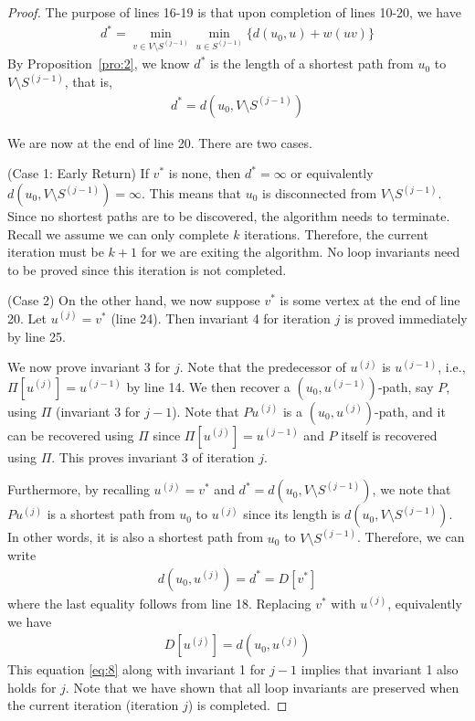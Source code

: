 \documentclass[thmcnt=section, 12pt, color=cyan]{my-elegantbook}
\begin{document}
\begin{proof}
    The purpose of lines 16-19 is that upon completion of lines 10-20, we have 
    \begin{align*}
        d^\ast = \min_{v \in V \setminus S^{(j-1)}}
            \min_{u \in S^{(j-1)}} \{ d(u_0, u) + w(u v) \}
    \end{align*}
    By Proposition~\ref{pro:2}, we know $d^\ast$ is the length of a shortest path from $u_0$ to $V \setminus S^{(j-1)}$, that is, 
    \begin{align*}
        d^\ast = d(u_0, V \setminus S^{(j-1)})
    \end{align*}

    We are now at the end of line 20. There are two cases. 
    
    (Case 1: Early Return) If $v^\ast$ is none, then $d^\ast = \infty$ or equivalently $d(u_0, V \setminus S^{(j-1)}) = \infty$. This means that $u_0$ is disconnected from $V \setminus S^{(j-1)}$. Since no shortest paths are to be discovered, the algorithm needs to terminate. Recall we assume we can only complete $k$ iterations. Therefore, the current iteration must be $k+1$ for we are exiting the algorithm. No loop invariants need to be proved since this iteration is not completed.

    (Case 2) On the other hand, we now suppose $v^\ast$ is some vertex at the end of line 20. Let $u^{(j)} = v^\ast$ (line 24). Then invariant 4 for iteration $j$ is proved immediately by line 25.
    
    We now prove invariant 3 for $j$. Note that the predecessor of $u^{(j)}$ is $u^{(j-1)}$, i.e., $\Pi[u^{(j)}] = u^{(j-1)}$ by line 14. We then recover a $(u_0, u^{(j-1)})$-path, say $P$, using $\Pi$ (invariant 3 for $j-1$). Note that $P u^{(j)}$ is a $(u_0, u^{(j)})$-path, and it can be recovered using $\Pi$ since $\Pi[u^{(j)}] = u^{(j-1)}$ and $P$ itself is recovered using $\Pi$. This proves invariant 3 of iteration $j$.

    Furthermore, by recalling $u^{(j)} = v^\ast$ and $d^\ast = d(u_0, V \setminus S^{(j-1)})$, we note that $P u^{(j)}$ is a shortest path from $u_0$ to $u^{(j)}$ since its length is $d(u_0, V \setminus S^{(j-1)})$. In other words, it is also a shortest path from $u_0$ to $V \setminus S^{(j-1)}$. Therefore, we can write 
    \begin{align*}
        d(u_0, u^{(j)}) = d^\ast = D[v^\ast]
    \end{align*}
    where the last equality follows from line 18. Replacing $v^\ast$ with $u^{(j)}$, equivalently we have 
    \begin{align}
        D[u^{(j)}] = d(u_0, u^{(j)})
        \label{eq:8}
    \end{align}
    This equation \eqref{eq:8} along with invariant 1 for $j-1$ implies that invariant 1 also holds for $j$. Note that we have shown that all loop invariants are preserved when the current iteration (iteration $j$) is completed.


\end{proof}
\end{document}
